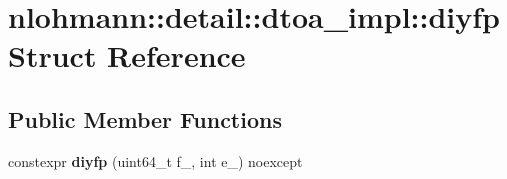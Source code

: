\hypertarget{structnlohmann_1_1detail_1_1dtoa__impl_1_1diyfp}{}\section{nlohmann\+:\+:detail\+:\+:dtoa\+\_\+impl\+:\+:diyfp Struct Reference}
\label{structnlohmann_1_1detail_1_1dtoa__impl_1_1diyfp}
\subsection*{Public Member Functions}
\begin{DoxyCompactItemize}
\item 
\mbox{\label{structnlohmann_1_1detail_1_1dtoa__impl_1_1diyfp_a332ba792e67dd40cd99a23f6dceb7792}} 
constexpr {\bfseries diyfp} (uint64\+\_\+t f\+\_\+, int e\+\_\+) noexcept
\end{DoxyCompactItemize}
